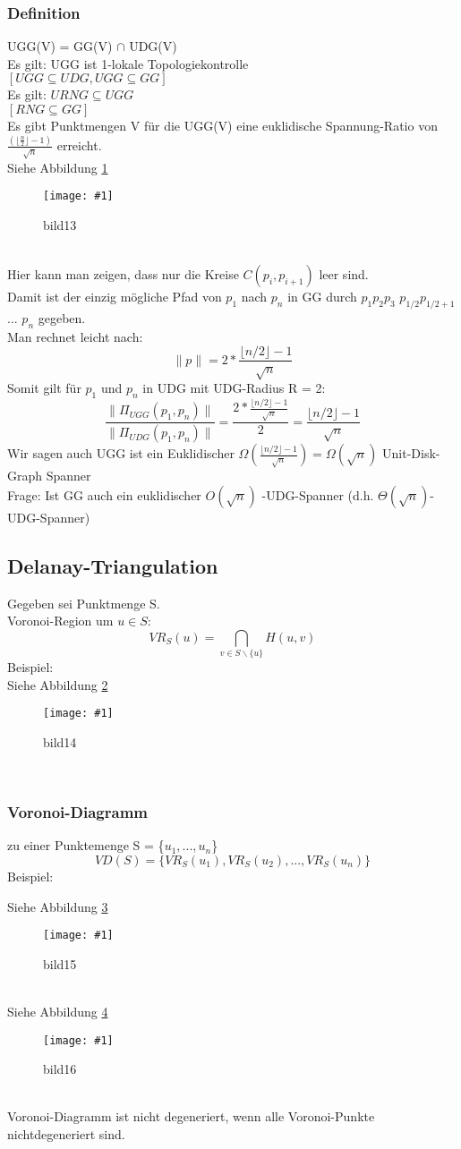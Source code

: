 \documentclass{article}
\newcommand{\bild}[4]{ %
	\begin{figure}[h!]
		\centering
		\texttt{[image: \#1]}
		\caption{#3}
		\label{#4}
	\end{figure}	
}
\newcommand{\sieheBild}[4]{
	Siehe Abbildung \ref{#4}
	\bild{#1}{#2}{#3}{#4}
}
\newcommand{\doubleAbs}[1]{
	\|#1\|
}
\newcommand{\floor}[1]{
	\lfloor #1 \rfloor
}
\begin{document}
\subsubsection*{Definition}
UGG(V) = GG(V) $\cap$ UDG(V)\\
Es gilt: UGG ist 1-lokale Topologiekontrolle\\
$[UGG \subseteq UDG, UGG \subseteq GG]$\\
Es gilt: $URNG \subseteq UGG$\\
$[RNG \subseteq GG]$
\\
Es gibt Punktmengen V für die UGG(V) eine euklidische Spannung-Ratio von $\frac{(\lfloor \frac{n}{2}\rfloor-1)}{\sqrt{n}}$ erreicht.\\
\sieheBild{Bilder/13.png}{0.4}{bild13}{Bild 13}\\
Hier kann man zeigen, dass nur die Kreise $C(p_i, p_{i+1})$ leer sind.\\
Damit ist der einzig mögliche Pfad von $p_1$ nach $p_n$ in GG durch $p_1 p_2 p_3$ $p_{1/2} p_{1/2+1}$ ... $p_n$ gegeben.\\
Man rechnet leicht nach:
\[
	\doubleAbs{p} = 2 * \frac{\lfloor n/2 \rfloor -1}{\sqrt{n}}
\]
Somit gilt für $p_1$ und $p_n$ in UDG mit UDG-Radius R = 2:
\[
	\frac{\doubleAbs{\Pi_{UGG}(p_1, p_n)}}{\doubleAbs{\Pi_{UDG}(p_1, p_n)}} = \frac{2 * \frac{\lfloor n/2 \rfloor -1}{\sqrt{n}}}{2} = \frac{\lfloor n/2 \rfloor -1}{\sqrt{n}}
\]
Wir sagen auch UGG ist ein Euklidischer $\Omega(\frac{\floor{n/2}-1}{\sqrt{n}}) = \Omega(\sqrt{n})$
Unit-Disk-Graph Spanner\\
Frage: Ist GG auch ein euklidischer $O(\sqrt{n})$ -UDG-Spanner (d.h. $\Theta(\sqrt{n})$-UDG-Spanner)

\subsection*{Delanay-Triangulation}
Gegeben sei Punktmenge S.\\
Voronoi-Region um $u \in S$:
\[
	VR_S(u) = \bigcap\limits_{v \in S \backslash \{u\}}{} H(u,v)
\]
Beispiel:\\
\sieheBild{Bilder/14.png}{0.4}{bild14}{Bild 14}\\

\subsubsection*{Voronoi-Diagramm}
zu einer Punktemenge S = \{$u_1, ..., u_n$\}
\[
	VD(S) = \{VR_S(u_1), VR_S(u_2), ..., VR_S(u_n)\}
\]
Beispiel:
\sieheBild{Bilder/15.png}{0.4}{bild15}{Bild 15}\\
\sieheBild{Bilder/16.png}{0.4}{bild16}{Bild 16}\\
Voronoi-Diagramm ist nicht degeneriert, wenn alle Voronoi-Punkte nichtdegeneriert sind.
\end{document}
